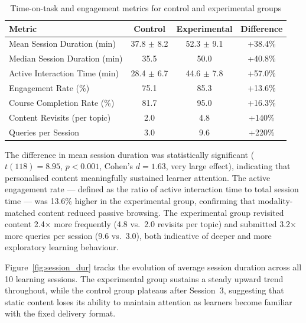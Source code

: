 \begin{table}[htb]
	\fontsize{10}{12}\selectfont
	\centering
	\caption{Time-on-task and engagement metrics for control and experimental groups}
	\label{tab:engagement}
	\begin{tabular}{|p{4.5cm}|c|c|c|}
		\hline
		\textbf{Metric} & \textbf{Control} & \textbf{Experimental} & \textbf{Difference} \\
		\hline
		Mean Session Duration (min)   & 37.8 $\pm$ 8.2 & 52.3 $\pm$ 9.1 & +38.4\% \\
		\hline
		Median Session Duration (min) & 35.5           & 50.0           & +40.8\% \\
		\hline
		Active Interaction Time (min) & 28.4 $\pm$ 6.7 & 44.6 $\pm$ 7.8 & +57.0\% \\
		\hline
		Engagement Rate (\%)          & 75.1           & 85.3           & +13.6\% \\
		\hline
		Course Completion Rate (\%)   & 81.7           & 95.0           & +16.3\% \\
		\hline
		Content Revisits (per topic)  & 2.0            & 4.8            & +140\%  \\
		\hline
		Queries per Session           & 3.0            & 9.6            & +220\%  \\
		\hline
	\end{tabular}
\end{table}

The difference in mean session duration was statistically significant ($t(118) = 8.95$, $p < 0.001$, Cohen's $d = 1.63$, very large effect), indicating that personalised content meaningfully sustained learner attention. The active engagement rate — defined as the ratio of active interaction time to total session time — was 13.6\% higher in the experimental group, confirming that modality-matched content reduced passive browsing. The experimental group revisited content 2.4$\times$ more frequently (4.8 vs.\ 2.0 revisits per topic) and submitted 3.2$\times$ more queries per session (9.6 vs.\ 3.0), both indicative of deeper and more exploratory learning behaviour.

Figure~\ref{fig:session_dur} tracks the evolution of average session duration across all 10 learning sessions. The experimental group sustains a steady upward trend throughout, while the control group plateaus after Session~3, suggesting that static content loses its ability to maintain attention as learners become familiar with the fixed delivery format.

